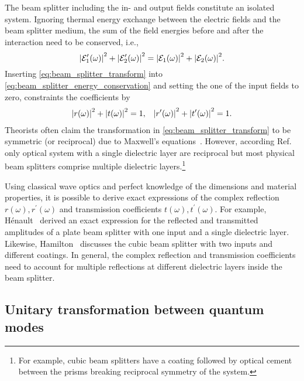 The beam splitter including the in- and output fields constitute an isolated system.
Ignoring thermal energy exchange between the electric fields and the beam splitter medium, the sum of the field energies before and after the interaction need to be conserved, i.e.,
\begin{equation}
    \abs{\mathcal{E}_1^\prime(\omega)}^2
    +
    \abs{\mathcal{E}_2^\prime(\omega)}^2
    =
    \abs{\mathcal{E}_1(\omega)}^2
    +
    \abs{\mathcal{E}_2(\omega)}^2
    \label{eq:beam_splitter_energy_conservation}
    .
\end{equation}
Inserting \cref{eq:beam_splitter_transform} into \cref{eq:beam_splitter_energy_conservation} and setting the one of the input fields to zero, constraints the coefficients by
\begin{align}
    \abs{r(\omega)}^2+\abs{t(\omega)}^2
    =
    1,
    &&
    \abs{r^\prime(\omega)}^2+\abs{t^\prime(\omega)}^2
    =
    1
    \label{eq:beam_splitter_coefficients_constraint}
    .
\end{align}
Theorists often claim the transformation in \cref{eq:beam_splitter_transform} to be symmetric (or reciprocal) due to Maxwell's equations~\cite[p.~129]{Haroche2006}.
However, according Ref.~\cite{Potton2004} only optical system with a single dielectric layer are reciprocal but most physical beam splitters comprise multiple dielectric layers.\footnote{For example, cubic beam splitters have a coating followed by optical cement between the prisms breaking reciprocal symmetry of the system.}

Using classical wave optics and perfect knowledge of the dimensions and material properties, it is possible to derive exact expressions of the complex reflection $r(\omega),r^\prime(\omega)$ and transmission coefficients $t(\omega),t^\prime(\omega)$.
For example, Hénault~\cite{Henault2015} derived an exact expression for the reflected and transmitted amplitudes of a plate beam splitter with one input and a single dielectric layer.
Likewise, Hamilton~\cite{Hamilton2000} discusses the cubic beam splitter with two inputs and different coatings.
In general, the complex reflection and transmission coefficients need to account for multiple reflections at different dielectric layers inside the beam splitter.

\FloatBarrier
\subsection{Unitary transformation between quantum modes}

